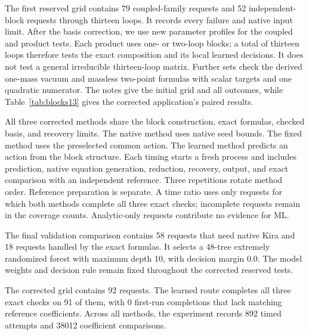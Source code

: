 The first reserved grid contains 79 coupled-family requests and 52 independent-block requests through thirteen loops. It records every failure and native input limit. After the basis correction, we use new parameter profiles for the coupled and product tests. Each product uses one- or two-loop blocks; a total of thirteen loops therefore tests the exact composition and its local learned decisions. It does not test a general irreducible thirteen-loop matrix. Further sets check the derived one-mass vacuum and massless two-point formulas with scalar targets and one quadratic numerator. The notes give the initial grid and all outcomes, while Table~\ref{tab:blocks13} gives the corrected application's paired results.

All three corrected methods share the block construction, exact formulas, checked basis, and recovery limits. The native method uses native seed bounds. The fixed method uses the preselected common action. The learned method predicts an action from the block structure. Each timing starts a fresh process and includes prediction, native equation generation, reduction, recovery, output, and exact comparison with an independent reference. Three repetitions rotate method order. Reference preparation is separate. A time ratio uses only requests for which both methods complete all three exact checks; incomplete requests remain in the coverage counts. Analytic-only requests contribute no evidence for ML.

The final validation comparison contains 58 requests that need native Kira and 18 requests handled by the exact formulas. It selects a 48-tree extremely randomized forest with maximum depth 10, with decision margin 0.0. The model weights and decision rule remain fixed throughout the corrected reserved tests.

The corrected grid contains 92 requests. The learned route completes all three exact checks on 91 of them, with 0 first-run completions that lack matching reference coefficients. Across all methods, the experiment records 892 timed attempts and 38012 coefficient comparisons.

